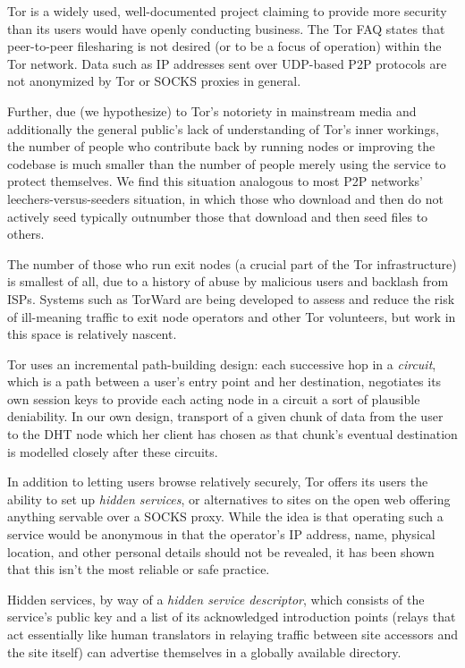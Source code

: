 Tor is a widely used, well-documented project claiming to provide more security than its users would have openly
conducting business. The Tor FAQ states that peer-to-peer filesharing is not desired (or to be a focus of operation)
within the Tor network. Data such as IP addresses sent over UDP-based P2P protocols are not anonymized by Tor or
SOCKS proxies in general.

Further, due (we hypothesize) to Tor's notoriety in mainstream media and additionally the general public's lack of
understanding of Tor's inner workings, the number of people who contribute back by running nodes
or improving the codebase is much smaller than the number of people merely using the service to protect themselves.
We find this situation analogous to most P2P networks' leechers-versus-seeders situation, in which those who download
and then do not actively seed typically outnumber those that download and then seed files to others.

The number of those who run exit nodes (a crucial part of the Tor infrastructure) is smallest of all, due to a history of
abuse by malicious users and backlash from ISPs. Systems such as TorWard are being developed to assess and reduce the
risk of ill-meaning traffic to exit node operators and other Tor volunteers, but work in this space is relatively nascent.

Tor uses an incremental path-building design: each successive hop in a \textit{circuit}, which is a path between a user's entry
point and her destination, negotiates its own session keys to provide each acting node in a circuit a sort of plausible
deniability. In our own design, transport of a given chunk of data from
the user to the DHT node which her client has chosen as that chunk's eventual destination is modelled closely
after these circuits.

In addition to letting users browse relatively securely,
Tor offers its users the ability to set up \textit{hidden services}, or alternatives to sites on the open web offering anything
servable over a SOCKS proxy. While the idea is that operating such a service would be anonymous in that the operator's
IP address, name, physical location, and other personal details should not be revealed, it has been shown that this isn't
the most reliable or safe practice.

Hidden services, by way of a \textit{hidden service descriptor}, which consists of the service's public key and a list of its
acknowledged introduction points (relays that act essentially like human translators in relaying traffic between site
accessors and the site itself) can advertise themselves in a globally available directory.

